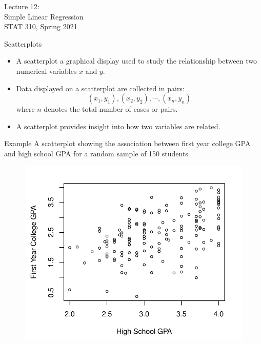 \documentclass[11pt, fleqn]{beamer}\usepackage[]{graphicx}\usepackage[]{color}
\begin{document}
\begin{frame}
\large
Lecture 12:\\
Simple Linear Regression\\
STAT 310, Spring 2021
\end{frame}

\begin{frame}{Scatterplots}
\begin{itemize}
\item A scatterplot a graphical display used to study the relationship between two numerical variables $x$ and $y$.  
\vspace{5pt}
\item Data displayed on a scatterplot are collected in pairs:
$$(x_1, y_1), (x_2, y_2), \cdots, (x_n, y_n)$$
where $n$ denotes the total number of cases or pairs.
\vspace{5pt}
\vspace{5pt}
\item A scatterplot provides insight into how two variables are related. 
\end{itemize}
\end{frame}

\begin{frame}{Example}
A scatterplot showing the association between first year college GPA and high school GPA for a random sample of 150 students.
\begin{figure}
\includegraphics[scale=0.5]{figure/gpa_scatter1.pdf}
\end{figure}
\end{frame}
\end{document}
